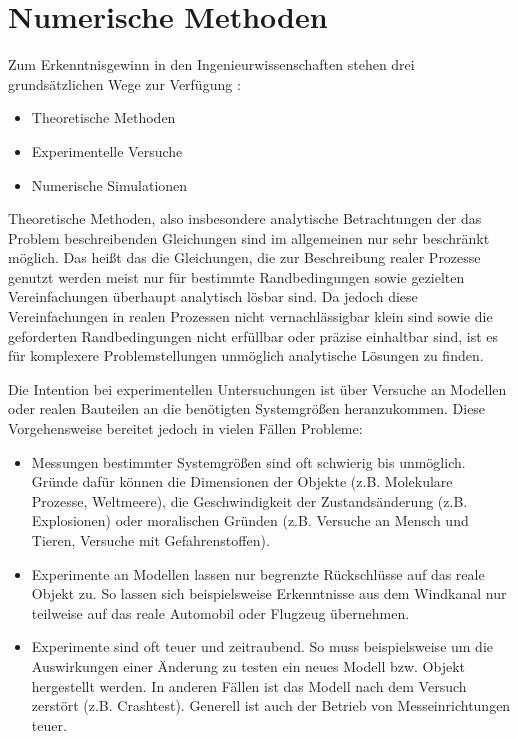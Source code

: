 \section{Numerische Methoden}

Zum Erkenntnisgewinn in den Ingenieurwissenschaften stehen drei grundsätzlichen
Wege zur Verfügung \cite{num_maschbau}:
\begin{itemize}
  \item Theoretische Methoden
  \item Experimentelle Versuche
  \item Numerische Simulationen
\end{itemize}

Theoretische Methoden, also insbesondere analytische Betrachtungen der das Problem
beschreibenden Gleichungen sind im allgemeinen nur sehr beschränkt möglich. Das heißt das
die Gleichungen, die zur Beschreibung realer Prozesse genutzt werden meist nur für
bestimmte Randbedingungen sowie gezielten Vereinfachungen überhaupt analytisch lösbar
sind. Da jedoch diese Vereinfachungen in realen Prozessen nicht vernachlässigbar klein sind
sowie die geforderten Randbedingungen nicht erfüllbar oder präzise einhaltbar sind, ist es
für komplexere Problemstellungen unmöglich analytische Lösungen zu finden.

Die Intention bei experimentellen Untersuchungen ist über Versuche an Modellen oder
realen Bauteilen an die benötigten Systemgrößen heranzukommen. Diese Vorgehensweise
bereitet jedoch in vielen Fällen Probleme:
\begin{itemize}
  \item Messungen bestimmter Systemgrößen sind oft schwierig bis unmöglich. Gründe
    dafür können die Dimensionen der Objekte (z.B. Molekulare Prozesse, Weltmeere),
    die Geschwindigkeit der Zustandsänderung (z.B. Explosionen) oder moralischen Gründen
    (z.B. Versuche an Mensch und Tieren, Versuche mit Gefahrenstoffen).
  \item Experimente an Modellen lassen nur begrenzte Rückschlüsse auf das reale Objekt
    zu. So lassen sich beispielsweise Erkenntnisse aus dem Windkanal nur teilweise auf
    das reale Automobil oder Flugzeug übernehmen.
  \item Experimente sind oft teuer und zeitraubend. So muss beispielsweise um die Auswirkungen
    einer Änderung zu testen ein neues Modell bzw. Objekt hergestellt werden. In anderen Fällen
    ist das Modell nach dem Versuch zerstört (z.B. Crashtest). Generell ist auch der Betrieb
    von Messeinrichtungen teuer.
\end{itemize}

